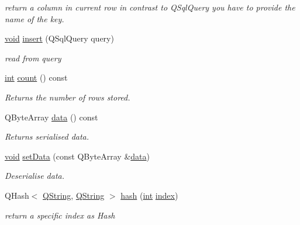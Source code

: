 \begin{DoxyCompactItemize}
\begin{DoxyCompactList}\small\item\em return a column in current row in contrast to Q\-Sql\-Query you have to provide the name of the {\itshape key}. \end{DoxyCompactList}\item 
\hyperlink{group___u_a_v_objects_plugin_ga444cf2ff3f0ecbe028adce838d373f5c}{void} \hyperlink{class_qxt_sql_package_a8cb821ede737fb9c783aaf9c4af661a9}{insert} (Q\-Sql\-Query query)
\begin{DoxyCompactList}\small\item\em read from {\itshape query} \end{DoxyCompactList}\item 
\hyperlink{ioapi_8h_a787fa3cf048117ba7123753c1e74fcd6}{int} \hyperlink{class_qxt_sql_package_aaa2f9f5f1eccaa7141fa61e8c049331f}{count} () const 
\begin{DoxyCompactList}\small\item\em Returns the number of rows stored. \end{DoxyCompactList}\item 
Q\-Byte\-Array \hyperlink{class_qxt_sql_package_abfed3d86a288985559b5bd161989545b}{data} () const 
\begin{DoxyCompactList}\small\item\em Returns serialised data. \end{DoxyCompactList}\item 
\hyperlink{group___u_a_v_objects_plugin_ga444cf2ff3f0ecbe028adce838d373f5c}{void} \hyperlink{class_qxt_sql_package_a3963e060e2e3a32138ea28381c982044}{set\-Data} (const Q\-Byte\-Array \&\hyperlink{glext_8h_a8850df0785e6fbcc2351af3b686b8c7a}{data})
\begin{DoxyCompactList}\small\item\em Deserialise {\itshape data}. \end{DoxyCompactList}\item 
Q\-Hash$<$ \hyperlink{group___u_a_v_objects_plugin_gab9d252f49c333c94a72f97ce3105a32d}{Q\-String}, \hyperlink{group___u_a_v_objects_plugin_gab9d252f49c333c94a72f97ce3105a32d}{Q\-String} $>$ \hyperlink{class_qxt_sql_package_ac326ae46d86a4cc8653fccdb298650d8}{hash} (\hyperlink{ioapi_8h_a787fa3cf048117ba7123753c1e74fcd6}{int} \hyperlink{glext_8h_ab47dd9958bcadea08866b42bf358e95e}{index})
\begin{DoxyCompactList}\small\item\em return a specific {\itshape index} as Hash \end{DoxyCompactList}\item 

\end{DoxyCompactItemize}
